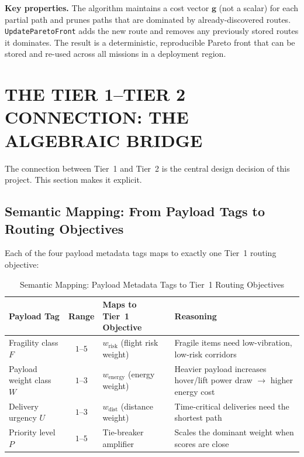 \textbf{Key properties.} The algorithm maintains a cost vector $\mathbf{g}$ (not a
scalar) for each partial path and prunes paths that are dominated by already-discovered
routes. \texttt{UpdateParetoFront} adds the new route and removes any previously stored
routes it dominates. The result is a deterministic, reproducible Pareto front that can be
stored and re-used across all missions in a deployment region.

\section{THE TIER 1--TIER 2 CONNECTION: THE ALGEBRAIC BRIDGE}
\label{sec:bridge}

The connection between Tier~1 and Tier~2 is the central design decision of this project.
This section makes it explicit.

\subsection{Semantic Mapping: From Payload Tags to Routing Objectives}

Each of the four payload metadata tags maps to exactly one Tier~1 routing objective:

\begin{table}[ht!]
\centering
\caption{Semantic Mapping: Payload Metadata Tags to Tier~1 Routing Objectives}
\label{tab:mapping}
\renewcommand{\arraystretch}{1.3}
\begin{tabular}{p{3.0cm}cp{4.0cm}p{5.5cm}}
\toprule
\textbf{Payload Tag} & \textbf{Range} & \textbf{Maps to Tier~1 Objective} & \textbf{Reasoning} \\
\midrule
Fragility class $F$ & $1$--$5$ & $w_{\mathrm{risk}}$ (flight risk weight) &
  Fragile items need low-vibration, low-risk corridors \\
Payload weight class $W$ & $1$--$3$ & $w_{\mathrm{energy}}$ (energy weight) &
  Heavier payload increases hover/lift power draw $\rightarrow$ higher energy cost \\
Delivery urgency $U$ & $1$--$3$ & $w_{\mathrm{dist}}$ (distance weight) &
  Time-critical deliveries need the shortest path \\
Priority level $P$ & $1$--$5$ & Tie-breaker amplifier &
  Scales the dominant weight when scores are close \\
\bottomrule
\end{tabular}
\end{table}

